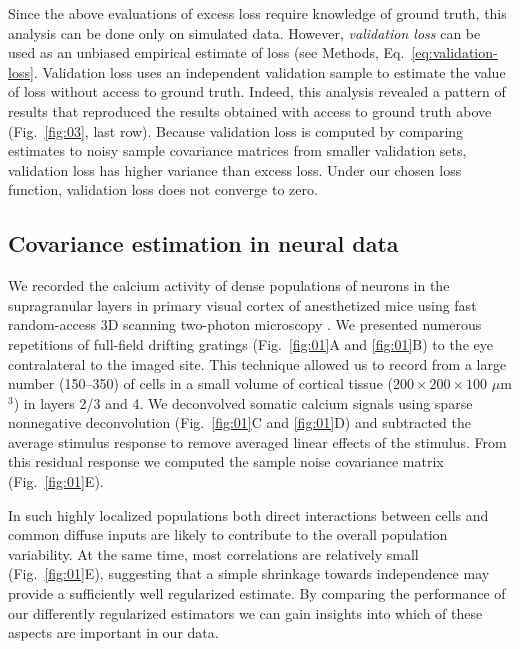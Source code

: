 \documentclass[10pt]{article}
\begin{document}
Since the above evaluations of excess loss require knowledge of ground truth, this analysis can be done only on simulated data. However, \emph{validation loss} can be used as an unbiased empirical estimate of loss  (see Methods, Eq.~\ref{eq:validation-loss}. Validation loss uses an independent validation sample to estimate the value of loss without access to ground truth.   Indeed, this analysis revealed a pattern of results that reproduced the results obtained with access to ground truth above (Fig.~\ref{fig:03}, last row). Because validation loss is computed by comparing estimates to noisy sample covariance matrices from smaller validation sets, validation loss has higher variance than excess loss. Under our chosen loss function, validation loss does not converge to zero. 

\subsection*{Covariance estimation in neural data}


We recorded the calcium activity of dense populations of neurons in the supragranular layers in primary visual cortex of anesthetized mice using fast random-access 3D scanning two-photon microscopy \cite{Stosiek:2003,Reddy:2005}. We presented numerous repetitions of full-field drifting gratings (Fig.~\ref{fig:01}A and \ref{fig:01}B) to the eye contralateral to the imaged site. This technique allowed us to record from a large number (150--350) of cells in a small volume of cortical tissue ($200\times200\times100$ $\mu$m$^3$) in layers 2/3 and 4. We deconvolved somatic calcium signals using sparse nonnegative deconvolution \cite{Vogelstein:2010} (Fig.~\ref{fig:01}C and \ref{fig:01}D) and subtracted the average stimulus response to remove averaged linear effects of the stimulus. From this residual response we computed the sample noise covariance matrix (Fig.~\ref{fig:01}E).


In such highly localized populations both direct interactions between cells and common diffuse inputs are likely to contribute to the overall population variability. At the same time, most correlations are relatively small (Fig.~\ref{fig:01}E), suggesting that a simple shrinkage towards independence may provide a sufficiently well regularized estimate. By comparing the performance of our differently regularized estimators we can gain insights into which of these aspects are important in our data.
\end{document}
